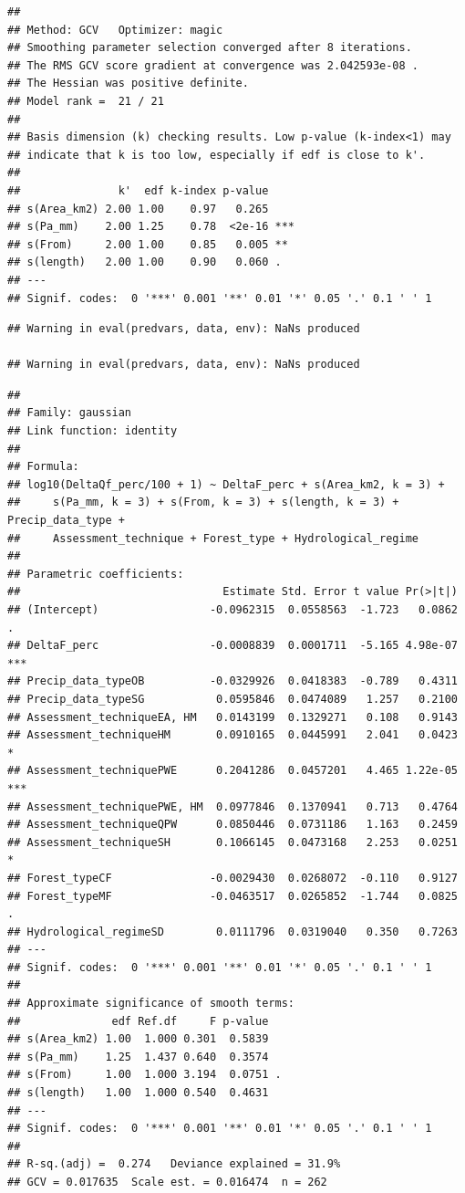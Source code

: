 \documentclass[]{elsarticle} %
\begin{document}
\begin{verbatim}
## 
## Method: GCV   Optimizer: magic
## Smoothing parameter selection converged after 8 iterations.
## The RMS GCV score gradient at convergence was 2.042593e-08 .
## The Hessian was positive definite.
## Model rank =  21 / 21 
## 
## Basis dimension (k) checking results. Low p-value (k-index<1) may
## indicate that k is too low, especially if edf is close to k'.
## 
##               k'  edf k-index p-value    
## s(Area_km2) 2.00 1.00    0.97   0.265    
## s(Pa_mm)    2.00 1.25    0.78  <2e-16 ***
## s(From)     2.00 1.00    0.85   0.005 ** 
## s(length)   2.00 1.00    0.90   0.060 .  
## ---
## Signif. codes:  0 '***' 0.001 '**' 0.01 '*' 0.05 '.' 0.1 ' ' 1
\end{verbatim}

\begin{verbatim}
## Warning in eval(predvars, data, env): NaNs produced

## Warning in eval(predvars, data, env): NaNs produced
\end{verbatim}

\begin{verbatim}
## 
## Family: gaussian 
## Link function: identity 
## 
## Formula:
## log10(DeltaQf_perc/100 + 1) ~ DeltaF_perc + s(Area_km2, k = 3) + 
##     s(Pa_mm, k = 3) + s(From, k = 3) + s(length, k = 3) + Precip_data_type + 
##     Assessment_technique + Forest_type + Hydrological_regime
## 
## Parametric coefficients:
##                               Estimate Std. Error t value Pr(>|t|)    
## (Intercept)                 -0.0962315  0.0558563  -1.723   0.0862 .  
## DeltaF_perc                 -0.0008839  0.0001711  -5.165 4.98e-07 ***
## Precip_data_typeOB          -0.0329926  0.0418383  -0.789   0.4311    
## Precip_data_typeSG           0.0595846  0.0474089   1.257   0.2100    
## Assessment_techniqueEA, HM   0.0143199  0.1329271   0.108   0.9143    
## Assessment_techniqueHM       0.0910165  0.0445991   2.041   0.0423 *  
## Assessment_techniquePWE      0.2041286  0.0457201   4.465 1.22e-05 ***
## Assessment_techniquePWE, HM  0.0977846  0.1370941   0.713   0.4764    
## Assessment_techniqueQPW      0.0850446  0.0731186   1.163   0.2459    
## Assessment_techniqueSH       0.1066145  0.0473168   2.253   0.0251 *  
## Forest_typeCF               -0.0029430  0.0268072  -0.110   0.9127    
## Forest_typeMF               -0.0463517  0.0265852  -1.744   0.0825 .  
## Hydrological_regimeSD        0.0111796  0.0319040   0.350   0.7263    
## ---
## Signif. codes:  0 '***' 0.001 '**' 0.01 '*' 0.05 '.' 0.1 ' ' 1
## 
## Approximate significance of smooth terms:
##              edf Ref.df     F p-value  
## s(Area_km2) 1.00  1.000 0.301  0.5839  
## s(Pa_mm)    1.25  1.437 0.640  0.3574  
## s(From)     1.00  1.000 3.194  0.0751 .
## s(length)   1.00  1.000 0.540  0.4631  
## ---
## Signif. codes:  0 '***' 0.001 '**' 0.01 '*' 0.05 '.' 0.1 ' ' 1
## 
## R-sq.(adj) =  0.274   Deviance explained = 31.9%
## GCV = 0.017635  Scale est. = 0.016474  n = 262
\end{verbatim}
\end{document}
